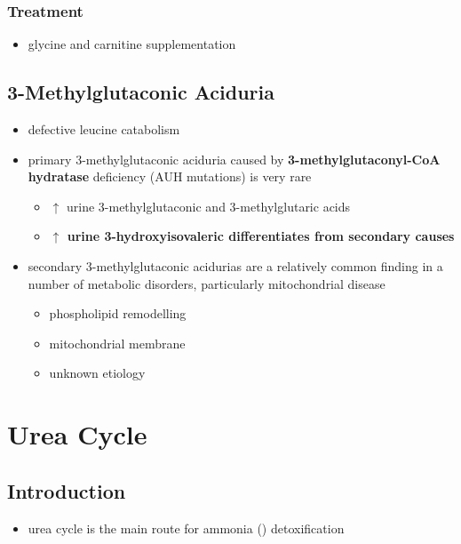 \documentclass[12pt]{scrartcl}
\begin{document}
\subsubsection{Treatment}
\label{sec:orga7121b9}
\begin{itemize}
\item glycine and carnitine supplementation
\end{itemize}

\subsection{3-Methylglutaconic Aciduria}
\label{sec:orge7e905d}
\begin{itemize}
\item defective leucine catabolism
\item primary 3-methylglutaconic aciduria caused by \textbf{3-methylglutaconyl-CoA}
\textbf{hydratase} deficiency (AUH mutations) is very rare
\begin{itemize}
\item \(\uparrow\) urine 3-methylglutaconic and 3-methylglutaric acids
\item \textbf{\(\uparrow\) urine 3-hydroxyisovaleric differentiates from secondary causes}
\end{itemize}
\end{itemize}


\begin{itemize}
\item secondary 3-methylglutaconic acidurias are a relatively common finding in a
number of metabolic disorders, particularly mitochondrial disease
\begin{itemize}
\item phospholipid remodelling
\item mitochondrial membrane
\item unknown etiology
\end{itemize}
\end{itemize}

\section{Urea Cycle}
\label{sec:org7c30c30}
\subsection{Introduction}
\label{sec:org3296538}
\begin{itemize}
\item urea cycle is the main route for ammonia () detoxification
\end{itemize}
\end{document}
